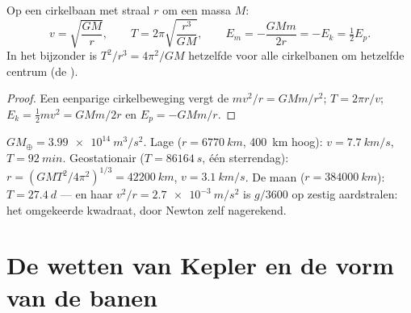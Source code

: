 \begin{theorem}[Cirkelbanen]\label{thm:b1:central-forces:circular}
Op een cirkelbaan met straal $r$ om een massa $M$:
\[
v = \sqrt{\frac{GM}{r}}, \qquad
T = 2\pi\sqrt{\frac{r^3}{GM}}, \qquad
E_m = -\frac{GMm}{2r} = -E_k = \tfrac12 E_p .
\]
In het bijzonder is $T^2/r^3 = 4\pi^2/GM$ hetzelfde voor alle cirkelbanen
om hetzelfde centrum (de ).
\end{theorem}

\begin{proof}
Een eenparige cirkelbeweging vergt de  $mv^2/r = GMm/r^2$;
$T = 2\pi r/v$; $E_k = \tfrac12 mv^2 = GMm/2r$ en $E_p = -GMm/r$.
\end{proof}

\begin{example}\label{ex:b1:central-forces:orbits}
$GM_\oplus = \qty{3.99e14}{m^3/s^2}$. Lage  ($r = \qty{6770}{km}$,
\qty{400}{km} hoog): $v = \qty{7.7}{km/s}$, $T = \qty{92}{min}$. Geostationair
($T = \qty{86164}{s}$, één sterrendag): $r = (GMT^2/4\pi^2)^{1/3} =
\qty{42200}{km}$, $v = \qty{3.1}{km/s}$. De maan ($r = \qty{384000}{km}$):
$T = \qty{27.4}{d}$ --- en haar  $v^2/r =
\qty{2.7e-3}{m/s^2}$ is $g/3600$ op zestig aardstralen: het omgekeerde
kwadraat, door Newton zelf nagerekend.
\end{example}

\section{De wetten van Kepler en de vorm van de banen}

